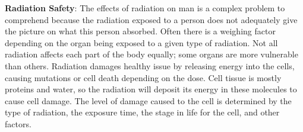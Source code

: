 \documentclass[12pt]{article}
\begin{document}
\item \textbf{Radiation Safety}: \newline
The effects of radiation on man is a complex problem to comprehend because the radiation exposed to a person does not adequately give the picture on what this person absorbed.  Often there is a weighing factor depending on the organ being exposed to a given type of radiation.  Not all radiation affects each part of the body equally; some organs are more vulnerable than others.  Radiation damages healthy issue by releasing energy into the cells, causing mutations or cell death depending on the dose.  Cell tissue is mostly proteins and water, so the radiation will deposit its energy in these molecules to cause cell damage.  The level of damage caused to the cell is determined by the type of radiation, the exposure time, the stage in life for the cell, and other factors. 
\end{document}
